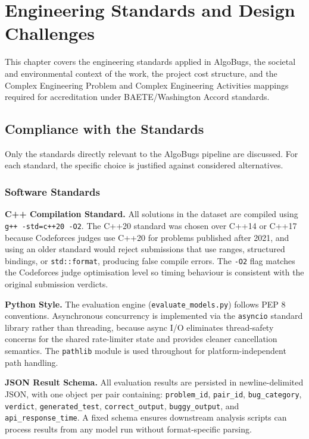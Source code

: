 \chapter{Engineering Standards and Design Challenges}

This chapter covers the engineering standards applied in AlgoBugs, the societal and environmental context of the work, the project cost structure, and the Complex Engineering Problem and Complex Engineering Activities mappings required for accreditation under BAETE/Washington Accord standards.

\section{Compliance with the Standards}

Only the standards directly relevant to the AlgoBugs pipeline are discussed. For each standard, the specific choice is justified against considered alternatives.

\subsection{Software Standards}

\textbf{C++ Compilation Standard.} All solutions in the dataset are compiled using \texttt{g++ -std=c++20 -O2}. The C++20 standard was chosen over C++14 or C++17 because Codeforces judges use C++20 for problems published after 2021, and using an older standard would reject submissions that use ranges, structured bindings, or \texttt{std::format}, producing false compile errors. The \texttt{-O2} flag matches the Codeforces judge optimisation level so timing behaviour is consistent with the original submission verdicts.

\textbf{Python Style.} The evaluation engine (\texttt{evaluate\_models.py}) follows PEP 8 conventions. Asynchronous concurrency is implemented via the \texttt{asyncio} standard library rather than threading, because async I/O eliminates thread-safety concerns for the shared rate-limiter state and provides cleaner cancellation semantics. The \texttt{pathlib} module is used throughout for platform-independent path handling.

\textbf{JSON Result Schema.} All evaluation results are persisted in newline-delimited JSON, with one object per pair containing: \texttt{problem\_id}, \texttt{pair\_id}, \texttt{bug\_category}, \texttt{verdict}, \texttt{generated\_test}, \texttt{correct\_output}, \texttt{buggy\_output}, and \texttt{api\_response\_time}. A fixed schema ensures downstream analysis scripts can process results from any model run without format-specific parsing.

